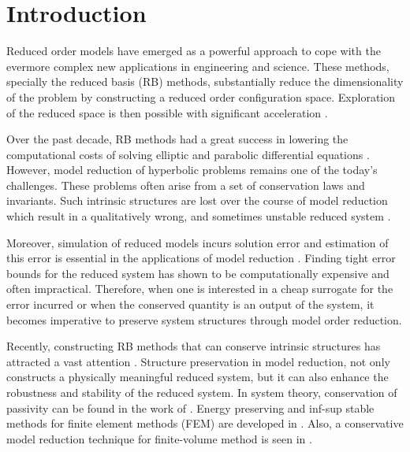 \section{Introduction}
\label{sec:intro}

Reduced order models have emerged as a powerful approach to cope with the evermore complex new applications in engineering and science. These methods, specially the reduced basis (RB) methods, substantially reduce the dimensionality of the problem by constructing a reduced order configuration space. Exploration of the reduced space is then possible with significant acceleration \cite{hesthaven2015certified,Haasdonk2017}.

Over the past decade, RB methods had a great success in lowering the computational costs of solving elliptic and parabolic differential equations \cite{ito1998reduced,ito2001reduced}. However, model reduction of hyperbolic problems remains one of the today's challenges. These problems often arise from a set of conservation laws and invariants. Such intrinsic structures are lost over the course of model reduction which result in a qualitatively wrong, and sometimes unstable reduced system \cite{Amsallem:2014ef}.

Moreover, simulation of reduced models incurs solution error and estimation of this error is essential in the applications of model reduction \cite{HaasdonkOhlberger11,RuinerEtAl12,BhattEtAl18}. Finding tight error bounds for the reduced system has shown to be computationally expensive and often impractical. Therefore, when one is interested in a cheap surrogate for the error incurred or when the conserved quantity is an output of the system, it becomes imperative to preserve system structures through model order reduction.


Recently, constructing RB methods that can conserve intrinsic structures has attracted a vast attention \cite{doi:10.1137/17M1111991,1705.00498,kalashnikova2014stabilization,farhat2015structure,doi:10.1137/110836742,doi:10.1137/140959602,beattie2011structure,doi:10.1137/140978922}. Structure preservation in model reduction, not only constructs a physically meaningful reduced system, but it can also enhance the robustness and stability of the reduced system. In system theory, conservation of passivity can be found in the work of \cite{polyuga2010structure,gugercin2012structure}. Energy preserving and inf-sup stable methods for finite element methods (FEM) are developed in \cite{farhat2015structure,ballarin2015supremizer}. Also, a conservative model reduction technique for finite-volume method is seen in \cite{1711.11550}.

